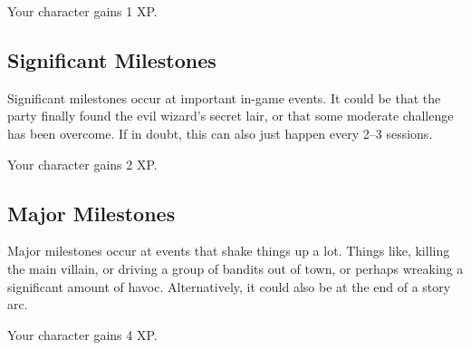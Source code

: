 Your character gains 1 XP.

\subsection{Significant Milestones}
Significant milestones occur at important in-game events.
It could be that the party finally found the evil wizard's secret lair, or that some moderate challenge has been overcome.
If in doubt, this can also just happen every 2--3 sessions.

Your character gains 2 XP.

\subsection{Major Milestones}
Major milestones occur at events that shake things up a lot.
Things like, killing the main villain, or driving a group of bandits out of town, or perhaps wreaking a significant amount of havoc.
Alternatively, it could also be at the end of a story arc.

Your character gains 4 XP.
